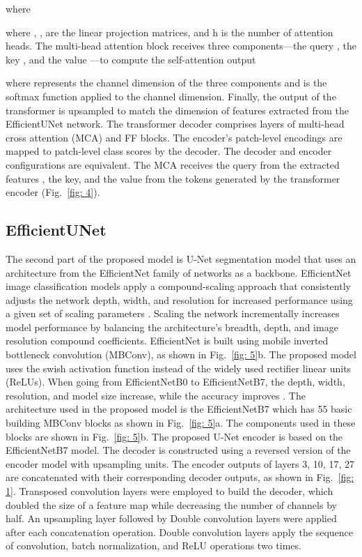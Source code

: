 \documentclass[journal]{IEEEtran}
\begin{document}
where

where , , are the linear projection matrices, and h is the number of attention heads.
The multi-head attention block receives three components—the query , the key , and the value —to compute the self-attention output

where  represents the channel dimension of the three components and  is the softmax function applied to the channel dimension. Finally, the output of the transformer is upsampled to match the dimension of features extracted from the EfficientUNet network. 
The transformer decoder comprises  layers of multi-head cross attention (MCA) and FF blocks. The encoder's patch-level encodings are mapped to patch-level class scores by the decoder. The decoder and encoder configurations are equivalent. The MCA receives the query from the extracted features , the key, and the value from the tokens  generated by the transformer encoder (Fig.~\ref{fig: 4}).  
\subsection{EfficientUNet}
The second part of the proposed model is U-Net segmentation model that uses an architecture from the EfficientNet family of networks as a backbone. EfficientNet image classification models apply a compound-scaling approach that consistently adjusts the network depth, width, and resolution for increased performance using a given set of scaling parameters \cite{pmlr-v97-tan19a}. Scaling the network incrementally increases model performance by balancing the architecture's breadth, depth, and image resolution compound coefficients. EfficientNet is built using mobile inverted bottleneck convolution (MBConv), as shown in Fig.~\ref{fig: 5}b. The proposed model uses the swish activation function \cite{Sandler_2018_CVPR} instead of the widely used rectifier linear units (ReLUs). When going from EfficientNetB0 to EfficientNetB7, the depth, width, resolution, and model size increase, while the accuracy improves \cite{pmlr-v97-tan19a}. The architecture used in the proposed model is the EfficientNetB7 which has 55 basic building MBConv blocks as shown in Fig.~\ref{fig: 5}a. The components used in these blocks are shown in Fig.~\ref{fig: 5}b.
The proposed U-Net encoder is based on the EfficientNetB7 model. The decoder is constructed using a reversed version of the encoder model with upsampling units. The encoder outputs of layers 3, 10, 17, 27 are concatenated with their corresponding decoder outputs, as shown in Fig.~\ref{fig: 1}. Transposed convolution layers were employed to build the decoder, which doubled the size of a feature map while decreasing the number of channels by half. An upsampling layer followed by Double convolution layers were applied after each concatenation operation. Double convolution layers apply the sequence of convolution, batch normalization, and ReLU operations two times. 
\end{document}
